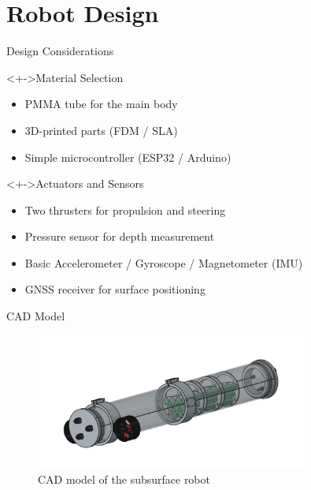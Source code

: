\documentclass[9pt, xcolor={usenames, dvipsnames}]{beamer}
\begin{document}
    \section{Robot Design}

        \begin{frame}{Design Considerations}
            \begin{block}<+->{Material Selection}
                \begin{itemize}
                    \item PMMA tube for the main body
                    \item 3D-printed parts (FDM / SLA)
                    \item Simple microcontroller (ESP32 / Arduino)
                \end{itemize}
            \end{block}
            \begin{block}<+->{Actuators and Sensors}
                \begin{itemize}
                    \item Two thrusters for propulsion and steering
                    \item Pressure sensor for depth measurement
                    \item Basic Accelerometer / Gyroscope / Magnetometer (IMU)
                    \item GNSS receiver for surface positioning
                \end{itemize}
            \end{block}
            
        \end{frame}

        \begin{frame}{CAD Model}
            \begin{figure}
                \centering
                \includegraphics[width=0.8\textwidth]{imgs/cad.png}
                \caption{CAD model of the subsurface robot}
            \end{figure}
        \end{frame}
\end{document}
